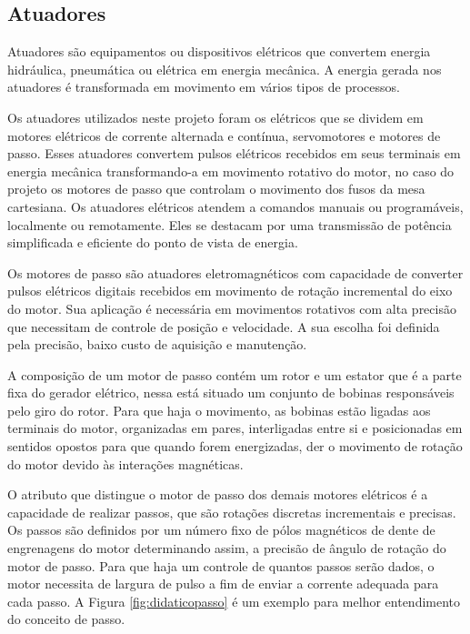 \subsection{Atuadores}\label{subsec:metatuadores}

Atuadores são equipamentos ou dispositivos elétricos que convertem energia hidráulica, pneumática 
ou elétrica em energia mecânica. A energia gerada nos atuadores é transformada em movimento em 
vários tipos de processos.

Os atuadores utilizados neste projeto foram os elétricos que se dividem em  motores elétricos de 
corrente alternada e contínua, servomotores e motores de passo. Esses atuadores convertem pulsos 
elétricos recebidos em seus terminais em energia mecânica transformando-a em movimento rotativo 
do motor, no caso do projeto os motores de passo que controlam o movimento dos fusos da mesa 
cartesiana. Os atuadores elétricos atendem a comandos manuais ou programáveis, localmente ou remotamente. 
Eles se destacam por uma transmissão de potência simplificada e eficiente do ponto de vista de energia.

Os motores de passo são atuadores eletromagnéticos com capacidade de converter pulsos elétricos digitais 
recebidos em movimento de rotação incremental do eixo do motor. Sua aplicação é necessária em movimentos 
rotativos com alta precisão que necessitam de controle de posição e velocidade. A sua escolha foi definida 
pela precisão, baixo custo de aquisição e manutenção.

A composição de um motor de passo contém um rotor e um estator que é a parte fixa do gerador elétrico,
nessa está situado um conjunto de bobinas responsáveis pelo giro do rotor. Para que haja o movimento, 
as bobinas estão ligadas aos terminais do motor, organizadas em pares, interligadas entre si e 
posicionadas em sentidos opostos para que quando forem energizadas, der o movimento de rotação 
do motor devido às interações magnéticas.

O atributo que distingue o motor de passo dos demais motores elétricos é a capacidade de realizar passos, 
que são rotações discretas incrementais e precisas. Os passos são definidos por um número fixo de 
pólos magnéticos de dente de engrenagens do motor determinando assim, a precisão de ângulo de rotação 
do motor de passo. Para que haja um controle de quantos passos serão dados, o motor necessita de 
largura de pulso a fim de enviar a corrente adequada para cada passo. A Figura \ref{fig:didaticopasso} 
é um exemplo para melhor entendimento do conceito de passo.

